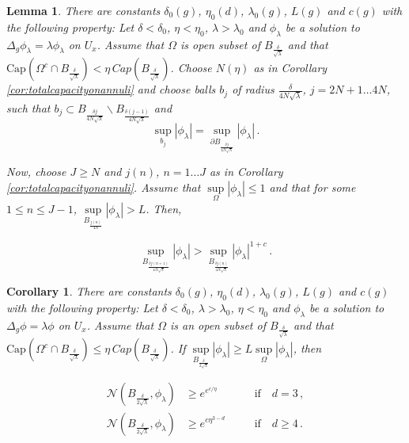 \documentclass[10pt,a4paper]{amsart}
\newtheorem{corollary}{Corollary}
\newtheorem{lemma}{Lemma}
\begin{document}
\begin{lemma}\label{lemma:inductive}
There are constants $\delta_0(g)$,  $\eta_0(d)$, $\lambda_0(g)$, $L(g)$ and $c(g)$  with the following property:
Let $\delta < \delta_0$, $\eta < \eta_0$, $\lambda > \lambda_0$ and $\phi_{\lambda}$ be a solution to $\Delta_{g} \phi_\lambda= \lambda \phi_\lambda$ on $U_{x}$.
Assume that $\Omega$ is open subset of  ${B_{\frac{\delta}{\sqrt{\lambda}}}}$ and that $\text{Cap}(\Omega^c \cap B_{\frac{\delta}{\sqrt{\lambda}}}) < \eta \,  Cap(B_{\frac{\delta}{\sqrt{\lambda}}})$.  Choose $N(\eta)$ as in Corollary \ref{cor:totalcapacityonannuli} and choose balls $b_j$ of radius $\frac{\delta}{4N\sqrt{\lambda}}$, $j=2N+1 \ldots 4N$, such that
$b_j \subset B_{\frac{\delta j}{4N\sqrt{\lambda}}} \backslash B_{\frac{\delta (j-1)}{4N\sqrt{\lambda}}}$ and 
\begin{equation}\label{eq:ballsmaxchoice}
    \sup\limits_{b_{j}} |\phi_{\lambda}| = \sup\limits_{\partial B_{\frac{\delta j}{4N\sqrt{\lambda}}}} |\phi_{\lambda}|\,.
\end{equation}


Now, choose $J \geq N$ and $j(n)$, $n=1 \ldots J$ as in Corollary \ref{cor:totalcapacityonannuli}. 
    Assume that $\sup\limits_\Omega |\phi_{\lambda}|\leq 1$ and that for some $1 \leq n \leq J-1$, $\sup\limits_{B_{\frac{j(n)}{4N}}} |\phi_{\lambda}|> L$. Then,  
    
    \begin{equation}
        \sup\limits_{B_{\frac{\delta j(n+1)}{4N\sqrt{\lambda}}}} |\phi_{\lambda}|>\sup\limits_{B_{\frac{\delta j(n)}{4N\sqrt{\lambda}}}} |\phi_{\lambda}|^{1+c}\,.
    \end{equation}
\end{lemma}

\begin{corollary}\label{lemma:growthmaximal}
There are constants $\delta_0(g)$,  $\eta_0(d)$, $\lambda_0(g)$, $L(g)$ and $c(g)$  with the following property:
Let $\delta < \delta_0$, $\lambda > \lambda_0$, $\eta < \eta_0$ and $\phi_{\lambda}$ be a solution to $\Delta_{g} \phi= \lambda \phi$ on $U_{x}$.
Assume that $\Omega$ is an open subset of ${B_{\frac{\delta}{\sqrt{\lambda}}}}$ and that $\text{Cap}(\Omega^c \cap B_{\frac{\delta}{\sqrt{\lambda}}}) \leq \eta \, Cap(B_{\frac{\delta}{\sqrt{\lambda}}})$. If $\sup\limits_{B_{\frac{\delta}{2\sqrt{\lambda}}}} |\phi_{\lambda}| \geq L \sup\limits_\Omega|\phi_{\lambda}|$, then  

\begin{align}
    \mathcal{N}(B_{\frac{\delta}{2\sqrt{\lambda}}},\phi_{\lambda}) &\geq e^{e^{c/\eta}} \quad && \text{if}\quad d=3 \, ,\\
     \mathcal{N}(B_{\frac{\delta}{2\sqrt{\lambda}}},\phi_{\lambda}) &\geq e^{c \eta^{3-d}} \quad && \text{if} \quad d \geq 4 \, .
\end{align}



\end{corollary}
\end{document}
